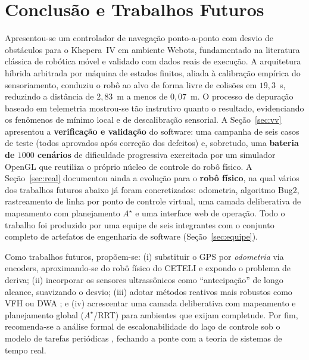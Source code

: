 \documentclass[11pt,a4paper]{article}
\begin{document}
\section{Conclusão e Trabalhos Futuros}\label{sec:conclusao}
Apresentou-se um controlador de navegação ponto-a-ponto com desvio de obstáculos para o Khepera~IV em ambiente Webots, fundamentado na literatura clássica de robótica móvel e validado com dados reais de execução. A arquitetura híbrida arbitrada por máquina de estados finitos, aliada à calibração empírica do sensoriamento, conduziu o robô ao alvo de forma livre de colisões em $19{,}3$~s, reduzindo a distância de $2{,}83$~m a menos de $0{,}07$~m. O processo de depuração baseado em telemetria mostrou-se tão instrutivo quanto o resultado, evidenciando os fenômenos de mínimo local e de descalibração sensorial. A Seção~\ref{sec:vv} apresentou a \textbf{verificação e validação} do software: uma campanha de seis casos de teste (todos aprovados após correção dos defeitos) e, sobretudo, uma \textbf{bateria de $1000$ cenários} de dificuldade progressiva exercitada por um simulador OpenGL que reutiliza o próprio núcleo de controle do robô físico. A Seção~\ref{sec:real} documentou ainda a evolução para o \textbf{robô físico}, na qual vários dos trabalhos futuros abaixo já foram concretizados: odometria, algoritmo Bug2, rastreamento de linha por ponto de controle virtual, uma camada deliberativa de mapeamento com planejamento $A^\star$ e uma interface web de operação. Todo o trabalho foi produzido por uma equipe de seis integrantes com o conjunto completo de artefatos de engenharia de software (Seção~\ref{sec:equipe}).

Como trabalhos futuros, propõem-se: (i) substituir o GPS por \emph{odometria} via encoders, aproximando-se do robô físico do CETELI e expondo o problema de deriva; (ii) incorporar os sensores ultrassônicos como ``antecipação'' de longo alcance, suavizando o desvio; (iii) adotar métodos reativos mais robustos como VFH \cite{borenstein1991vfh} ou DWA \cite{fox1997dwa}; e (iv) acrescentar uma camada deliberativa com mapeamento e planejamento global ($A^\star$/RRT) para ambientes que exijam completude. Por fim, recomenda-se a análise formal de escalonabilidade do laço de controle sob o modelo de tarefas periódicas \cite{liu1973}, fechando a ponte com a teoria de sistemas de tempo real.
\end{document}
